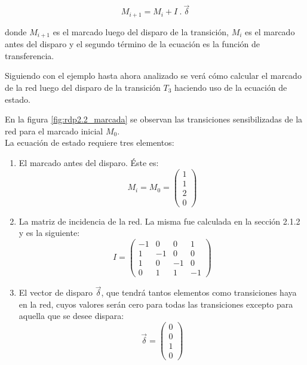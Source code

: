 \begin{equation}
    M_{i+1} = M_i + I \ . \ \vec{\delta}
    \label{ec:estado}
\end{equation}

\noindent donde $M_{i+1}$ es el marcado luego del disparo de la transición, $M_i$ es el marcado antes del disparo y el segundo término de la ecuación es la función de transferencia.

Siguiendo con el ejemplo hasta ahora analizado se verá cómo calcular el marcado de la red luego del disparo de la transición $T_3$ haciendo uso de la ecuación de estado.

En la figura \ref{fig:rdp2.2_marcada} se observan las transiciones sensibilizadas de la red para el marcado inicial $M_0$.
\\
La ecuación de estado requiere tres elementos:

\begin{enumerate}
    \item El marcado antes del disparo. Éste es:
        \begin{equation}
            M_i = M_0 = 
            \begin{pmatrix}
                1 \\
                1 \\
                2 \\
                0
            \end{pmatrix}
        \end{equation}
        
    \item La matriz de incidencia de la red. La misma fue calculada en la sección 2.1.2 y es la siguiente:
        \begin{equation}
           I = 
            \begin{pmatrix}
                -1 & 0 & 0 & 1 \\
                1 & -1 & 0 & 0 \\
                1 & 0 & -1 & 0 \\
                0 & 1 & 1 & -1 
            \end{pmatrix}
        \end{equation}
        
    \item El vector de disparo $\vec{\delta}$, que tendrá tantos elementos como transiciones haya en la red, cuyos valores serán cero para todas las transiciones excepto para aquella que se desee dispara:
        \begin{equation}
            \vec{\delta} = 
            \begin{pmatrix}
                0 \\
                0 \\
                1 \\
                0
            \end{pmatrix}
        \end{equation}
\end{enumerate}

